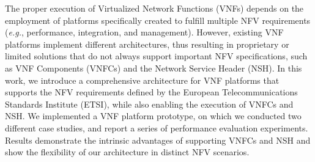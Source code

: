 The proper execution of Virtualized Network Functions (VNFs) depends on the employment of platforms specifically created to fulfill multiple NFV requirements (\textit{e.g.}, performance, integration, and management). However, existing VNF platforms implement different architectures, thus resulting in proprietary or limited solutions that do not always support important NFV specifications, such as VNF Components (VNFCs) and the Network Service Header (NSH). In this work, we introduce a comprehensive architecture for VNF platforms that supports the NFV requirements defined by the European Telecommunications Standards Institute (ETSI), while also enabling the execution of VNFCs and NSH. We implemented a VNF platform prototype, on which we conducted two different case studies, and report a series of performance evaluation experiments. Results demonstrate the intrinsic advantages of supporting VNFCs and NSH and show the flexibility of our architecture in distinct NFV scenarios.
